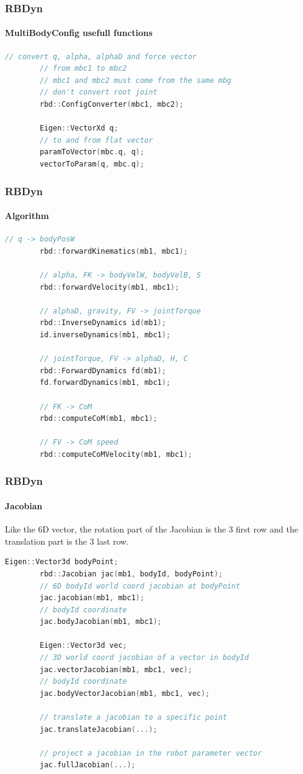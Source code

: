 \documentclass{beamer}
\begin{document}
\begin{frame}[fragile]
	\frametitle{RBDyn}
	\framesubtitle{MultiBodyConfig usefull functions}
	\begin{lstlisting}[language=C++]
		// convert q, alpha, alphaD and force vector
		// from mbc1 to mbc2
		// mbc1 and mbc2 must come from the same mbg
		// don't convert root joint
		rbd::ConfigConverter(mbc1, mbc2);

		Eigen::VectorXd q;
		// to and from flat vector
		paramToVector(mbc.q, q);
		vectorToParam(q, mbc.q);
	\end{lstlisting}
\end{frame}

\begin{frame}[fragile]
	\frametitle{RBDyn}
	\framesubtitle{Algorithm}
	\begin{lstlisting}[language=C++]
		// q -> bodyPosW
		rbd::forwardKinematics(mb1, mbc1);

		// alpha, FK -> bodyVelW, bodyVelB, S
		rbd::forwardVelocity(mb1, mbc1);

		// alphaD, gravity, FV -> jointTorque
		rbd::InverseDynamics id(mb1);
		id.inverseDynamics(mb1, mbc1);

		// jointTorque, FV -> alphaD, H, C
		rbd::ForwardDynamics fd(mb1);
		fd.forwardDynamics(mb1, mbc1);

		// FK -> CoM
		rbd::computeCoM(mb1, mbc1);

		// FV -> CoM speed
		rbd::computeCoMVelocity(mb1, mbc1);
	\end{lstlisting}
\end{frame}

\begin{frame}[fragile]
	\frametitle{RBDyn}
	\framesubtitle{Jacobian}
	Like the 6D vector, the rotation part of the Jacobian is the 3 first row and the translation part is the 3 last row.
	\begin{lstlisting}[language=C++]
		Eigen::Vector3d bodyPoint;
		rbd::Jacobian jac(mb1, bodyId, bodyPoint);
		// 6D bodyId world coord jacobian at bodyPoint
		jac.jacobian(mb1, mbc1);
		// bodyId coordinate
		jac.bodyJacobian(mb1, mbc1);

		Eigen::Vector3d vec;
		// 3D world coord jacobian of a vector in bodyId
		jac.vectorJacobian(mb1, mbc1, vec);
		// bodyId coordinate
		jac.bodyVectorJacobian(mb1, mbc1, vec);

		// translate a jacobian to a specific point
		jac.translateJacobian(...);

		// project a jacobian in the robot parameter vector
		jac.fullJacobian(...);
	\end{lstlisting}
\end{frame}
\end{document}

